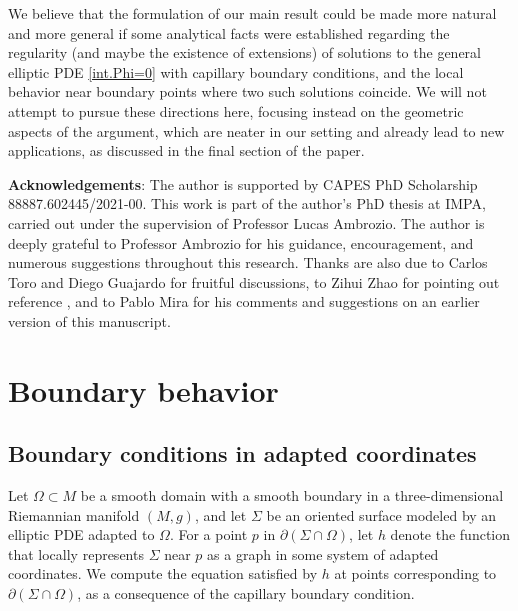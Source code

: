 \documentclass[11pt,reqno]{amsart}
\begin{document}
We believe that the formulation of our main result could be made more natural and more general if some analytical facts were established regarding the regularity (and maybe the existence of extensions) of solutions to the general elliptic PDE \eqref{int.Phi=0} with capillary boundary conditions, and the local behavior near boundary points where two such solutions coincide. We will not attempt to pursue these directions here, focusing instead on the geometric aspects of the argument, which are neater in our setting and already lead to new applications, as discussed in the final section of the paper.

\textbf{Acknowledgements}: The author is supported by CAPES PhD Scholarship 88887.602445/2021-00. This work is part of the author’s PhD thesis at IMPA, carried out under the supervision of Professor Lucas Ambrozio. The author is deeply grateful to Professor Ambrozio for his guidance, encouragement, and numerous suggestions throughout this research. Thanks are also due to Carlos Toro and Diego Guajardo for fruitful discussions, to Zihui Zhao for pointing out reference \cite{KinNirSpr}, and to Pablo Mira for his comments and suggestions on an earlier version of this manuscript.

\section{Boundary behavior}


\subsection{Boundary conditions in adapted coordinates} Let $\Omega\subset M$ be a smooth domain with a smooth boundary in a three-dimensional Riemannian manifold $(M,g)$, and let $\Sigma$ be an oriented surface modeled by an elliptic PDE adapted to $\Omega$. For a point $p$ in $\partial(\Sigma\cap\Omega)$, let $h$ denote the function that locally represents $\Sigma$ near $p$ as a graph in some system of adapted coordinates. We compute the equation satisfied by $h$ at points corresponding to $\partial(\Sigma\cap \Omega)$, as a consequence of the capillary boundary condition.
\end{document}
